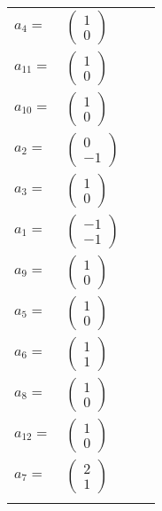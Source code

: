 \documentclass[1p]{elsarticle_modified}
\theoremstyle{definition}
\begin{document}
\begin{tabular}{m{7pt} m{180pt} m{7pt} m{180pt} }
\flushright $a_{4}=$&$\begin{pmatrix}1\\0\end{pmatrix}$ \\
\flushright $a_{11}=$&$\begin{pmatrix}1\\0\end{pmatrix}$ \\
\flushright $a_{10}=$&$\begin{pmatrix}1\\0\end{pmatrix}$ \\
\flushright $a_{2}=$&$\begin{pmatrix}0\\-1\end{pmatrix}$ \\
\flushright $a_{3}=$&$\begin{pmatrix}1\\0\end{pmatrix}$ \\
\flushright $a_{1}=$&$\begin{pmatrix}-1\\-1\end{pmatrix}$ \\
\flushright $a_{9}=$&$\begin{pmatrix}1\\0\end{pmatrix}$ \\
\flushright $a_{5}=$&$\begin{pmatrix}1\\0\end{pmatrix}$ \\
\flushright $a_{6}=$&$\begin{pmatrix}1\\1\end{pmatrix}$ \\
\flushright $a_{8}=$&$\begin{pmatrix}1\\0\end{pmatrix}$ \\
\flushright $a_{12}=$&$\begin{pmatrix}1\\0\end{pmatrix}$ \\
\flushright $a_{7}=$&$\begin{pmatrix}2\\1\end{pmatrix}$\\&\end{tabular}
\end{document}
